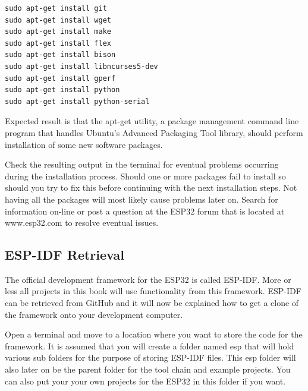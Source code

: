 \documentclass{tufte-book}
\begin{document}
\begin{lstlisting}
sudo apt-get install git
sudo apt-get install wget
sudo apt-get install make
sudo apt-get install flex
sudo apt-get install bison
sudo apt-get install libncurses5-dev
sudo apt-get install gperf
sudo apt-get install python
sudo apt-get install python-serial
\end{lstlisting}

Expected result is that the apt-get utility, a package management command line program that handles Ubuntu's Advanced Packaging Tool library, should perform installation of some new software packages.
 
Check the resulting output in the terminal for eventual problems occurring during the installation process. Should one or more packages fail to install so should you try to fix this before continuing with the next installation steps. Not having all the packages will most likely cause problems later on. Search for information on-line or post a question at the ESP32 forum that is located at www.esp32.com to resolve eventual issues.

\subsection{ESP-IDF Retrieval}


The official development framework for the ESP32 is called ESP-IDF. More or less all projects in this book will use functionality from this framework. ESP-IDF can be retrieved from GitHub and it will now be explained how to get a clone of the framework onto your development computer.

Open a terminal and move to a location where you want to store the code for the framework. It is assumed that you will create a folder named esp that will hold various sub folders for the purpose of storing ESP-IDF files. This esp folder will also later on be the parent folder for the tool chain and example projects. You can also put your your own projects for the ESP32 in this folder if you want.

\end{document}
